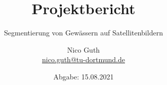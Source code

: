 \documentclass[
  fontsize=12pt,
  bibliography=totoc,     %
  captions=tableheading,  %
  titlepage=firstiscover, %
  parskip=half,           %
]{scrartcl}
\author{%
  Nico Guth\\%
  \href{mailto:nico.guth@tu-dortmund.de}{nico.guth@tu-dortmund.de}%
}
\title{Projektbericht}
\subtitle{Segmentierung von Gewässern auf Satellitenbildern}
\date{Abgabe: 15.08.2021}
\begin{document}
\begin{spacing}{1}
  \maketitle
\end{spacing}
\thispagestyle{empty}
\tableofcontents
\newpage







\printbibliography{}
\end{document}
